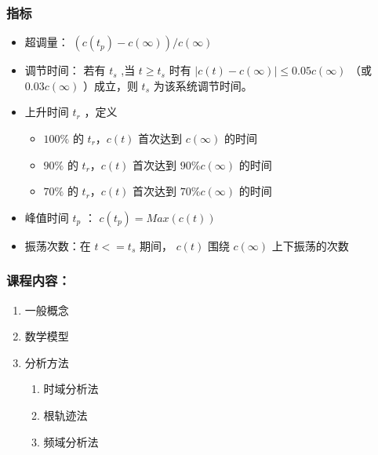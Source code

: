 \documentclass{article}
\begin{document}
\begin{frame}
\frametitle{指标}
\label{sec-2-2-3}

\begin{itemize}
\item 超调量：  $(c(t_p)-c(\infty))/c(\infty)$
\item 调节时间： 若有 $t_s$ ,当 $t\geq t_s$ 时有 $|c(t)-c(\infty)|\leq 0.05c(\infty)$ （或 $0.03c(\infty)$ ）成立，则 $t_s$ 为该系统调节时间。
\item 上升时间 $t_r$ ，定义
\begin{itemize}
\item $100\%$ 的 $t_r，c(t)$ 首次达到 $c(\infty)$ 的时间
\item $90\%$ 的 $t_r，c(t)$ 首次达到 $90\%c(\infty)$ 的时间
\item $70\%$ 的 $t_r，c(t)$ 首次达到 $70\%c(\infty)$ 的时间
\end{itemize}
\item 峰值时间 $t_p$ ： $c(t_p)=Max(c(t))$
\item 振荡次数：在 $t<=t_s$ 期间， $c(t)$ 围绕 $c(\infty)$ 上下振荡的次数
\end{itemize}
\end{frame}
\begin{frame}
\frametitle{课程内容：}
\label{sec-2-2-4}

\begin{enumerate}
\item <2->一般概念
\item <3->数学模型
\item <4->分析方法
\begin{enumerate}
\item 时域分析法
\item 根轨迹法
\item 频域分析法
\end{enumerate}
\end{enumerate}
\end{frame}
\end{document}

